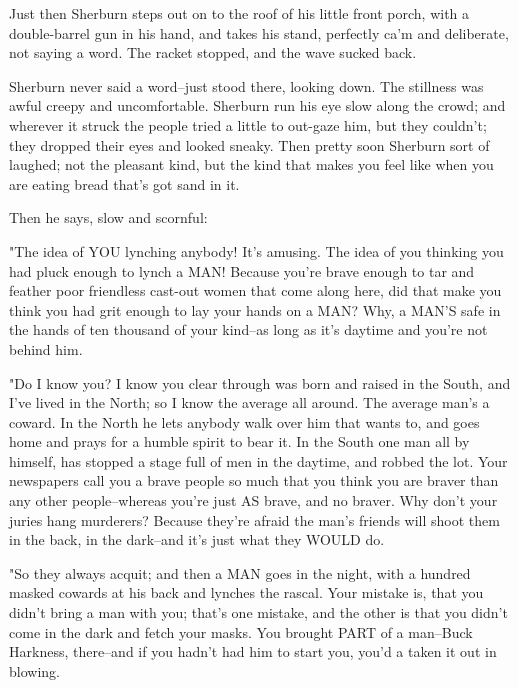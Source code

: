 Just then Sherburn steps out on to the roof of his little front porch,
with a double-barrel gun in his hand, and takes his stand, perfectly ca'm
and deliberate, not saying a word.  The racket stopped, and the wave
sucked back.

Sherburn never said a word--just stood there, looking down.  The
stillness was awful creepy and uncomfortable.  Sherburn run his eye slow
along the crowd; and wherever it struck the people tried a little to
out-gaze him, but they couldn't; they dropped their eyes and looked sneaky.
Then pretty soon Sherburn sort of laughed; not the pleasant kind, but the
kind that makes you feel like when you are eating bread that's got sand
in it.

Then he says, slow and scornful:

"The idea of YOU lynching anybody!  It's amusing.  The idea of you
thinking you had pluck enough to lynch a MAN!  Because you're brave
enough to tar and feather poor friendless cast-out women that come along
here, did that make you think you had grit enough to lay your hands on a
MAN?  Why, a MAN'S safe in the hands of ten thousand of your kind--as
long as it's daytime and you're not behind him.

"Do I know you?  I know you clear through was born and raised in the
South, and I've lived in the North; so I know the average all around.
The average man's a coward.  In the North he lets anybody walk over him
that wants to, and goes home and prays for a humble spirit to bear it.
In the South one man all by himself, has stopped a stage full of men in
the daytime, and robbed the lot.  Your newspapers call you a brave people
so much that you think you are braver than any other people--whereas
you're just AS brave, and no braver.  Why don't your juries hang
murderers?  Because they're afraid the man's friends will shoot them in
the back, in the dark--and it's just what they WOULD do.

"So they always acquit; and then a MAN goes in the night, with a hundred
masked cowards at his back and lynches the rascal.  Your mistake is, that
you didn't bring a man with you; that's one mistake, and the other is
that you didn't come in the dark and fetch your masks.  You brought PART
of a man--Buck Harkness, there--and if you hadn't had him to start you,
you'd a taken it out in blowing.

